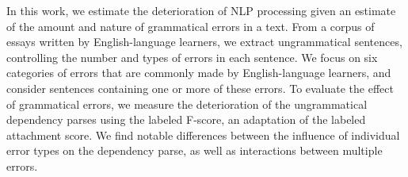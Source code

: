 In this work, we estimate the deterioration of NLP processing given an estimate of the amount and nature of grammatical errors in a text. From a corpus of essays written by English-language learners, we extract ungrammatical sentences, controlling the number and types of errors in each sentence. We focus on six categories of errors that are commonly made by English-language learners, and consider sentences containing one or more of these errors. To evaluate the effect of grammatical errors, we measure the deterioration of the ungrammatical dependency parses using the labeled F-score, an adaptation of the labeled attachment score. We find notable differences between the influence of individual error types on the dependency parse, as well as interactions between multiple errors.
